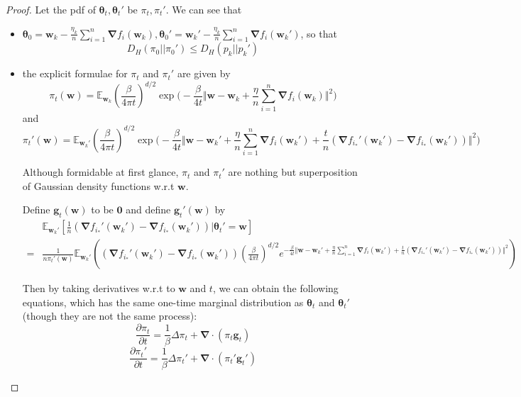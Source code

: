 \documentclass[final,12pt]{colt2018} %
\begin{document}
\begin{proof}
Let the pdf of $\bm{\theta}_t, \bm{\theta}_t'$ be $\pi_t, \pi_t'$. We can see that
\begin{itemize}
  \item $\bm{\theta}_0=\bm{w}_{k}- \frac{\eta_k}{n}\sum\limits_{i=1}^n\bm{\nabla} f_i(\bm{w}_{k}),\bm{\theta}_0'=\bm{w}_{k}'- \frac{\eta_k}{n}\sum\limits_{i=1}^n\bm{\nabla} f_i(\bm{w}_{k}')$, so that
  \begin{equation}
    D_H(\pi_0||\pi_0')\le D_H(p_k||p_k')
  \end{equation}
\item the explicit formulae for $\pi_t$ and $\pi_t'$ are given by
\begin{equation}
  \pi_t(\bm{w})=\mathbb{E}_{\bm{w}_k}\left(\frac{\beta}{4 \pi t}\right)^{d/2} \exp\Big(-\frac{\beta}{4t}\Vert\bm{w}-\bm{w}_k+\frac{\eta}{n}\sum\limits_{i=1}^n\bm{\nabla} f_i(\bm{w}_{k})\Vert^2\Big)
\end{equation}
and
\begin{equation}
  \pi_t'(\bm{w})=\mathbb{E}_{\bm{w}_k'}\left(\frac{\beta}{4 \pi t}\right)^{d/2} \exp\Big(-\frac{\beta}{4t}\Vert\bm{w}-\bm{w}_k'+\frac{\eta}{n}\sum\limits_{i=1}^n\bm{\nabla} f_i(\bm{w}_{k}')+ \frac{t}{n}\left(\bm{\nabla} f_{i_*}'(\bm{w}_k')-\bm{\nabla}f_{i_*}(\bm{w}_k')\right)\Vert^2\Big)
\end{equation}


Although formidable at first glance, $\pi_t$ and $\pi_t'$ are nothing but superposition of Gaussian density functions w.r.t $\bm{w}$.


Define $\bm{g}_t(\bm{w})$ to be $\bm{0}$ and define $\bm{g}_t'(\bm{w})$ by 
\begin{equation}
\begin{split}
  &\mathbb{E}_{\bm{w}_k'}[\frac{1}{n}\left(\bm{\nabla} f_{i_*}'(\bm{w}_k')-\bm{\nabla}f_{i_*}(\bm{w}_k')\right)|\bm{\theta}_t'=\bm{w}]\\
  =& \frac{1}{n\pi_t'(\bm{w})}\mathbb{E}_{\bm{w}_k'}\left(\left(\bm{\nabla} f_{i_*}'(\bm{w}_k')-\bm{\nabla}f_{i_*}(\bm{w}_k')\right)\left(\frac{\beta}{4 \pi t}\right)^{d/2} e^{-\frac{\beta}{4t}\Vert\bm{w}-\bm{w}_k'+\frac{\eta}{n}\sum\limits_{i=1}^n\bm{\nabla} f_i(\bm{w}_{k}')+ \frac{t}{n}\left(\bm{\nabla} f_{i_*}'(\bm{w}_k')-\bm{\nabla}f_{i_*}(\bm{w}_k')\right)\Vert^2}\right)
\end{split}
\end{equation}

Then by taking derivatives w.r.t to $\bm{w}$ and $t$, we can obtain the following equations, which has the same one-time marginal distribution as $\bm{\theta}_t$ and $\bm{\theta}_t'$ (though they are not the same process):
\begin{equation}
  \frac{\partial \pi_t}{\partial t}=\frac{1}{ \beta}\Delta \pi_t+\bm{\nabla}\cdot\left(\pi_t \bm{g}_t\right)
\end{equation}
\begin{equation}
  \frac{\partial \pi_t'}{\partial t}=\frac{1}{ \beta}\Delta \pi_t'+\bm{\nabla}\cdot\left(\pi_t'\bm{g}_t'\right)
\end{equation}
\end{itemize}


\end{proof}
\end{document}
